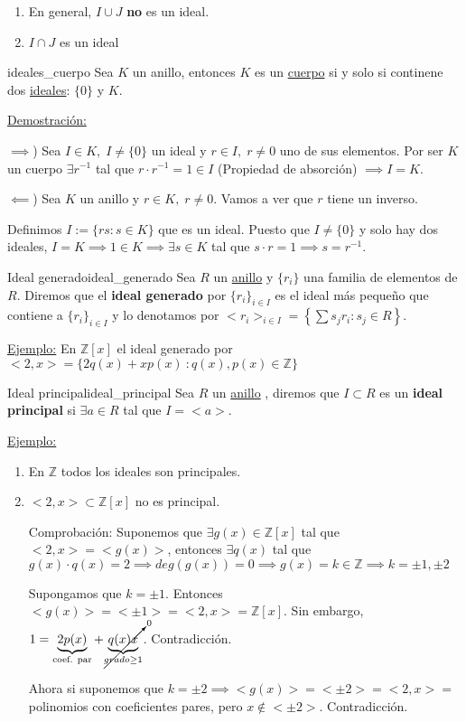 \documentclass[10pt, a4paper]{article}
\newcommand{\Z}{\mathbb{Z}}
\newcommand{\ej}{\underline{Ejemplo:} }
\newcommand{\demo}{\underline{Demostración:} }
\newcommand{\anillo}[1][]{\hyperref[def:anillo]{anillo}#1 }
\newenvironment{enumerater}{\begin{enumerate}[label=\roman*)]}
{\end{enumerate}}
\newenvironment{enumeratea}{\begin{enumerate}[label=\arabic*)]}
{\end{enumerate}}
\begin{document}
\begin{enumerater}
	\item En general, $I \cup J$ \textbf{no} es un ideal.
	\item $I \cap J$ es un ideal
\end{enumerater}

\begin{proposition}{}{ideales_cuerpo}
Sea $K$ un anillo, entonces $K$ es un \hyperref[def:cuerpo]{cuerpo} si y solo si continene dos \hyperref[def:ideal]{ideales}: $\{0\}$ y $K$.
\end{proposition}

\demo 

$\implies$) Sea $I \in K, \; I \neq \{0\}$ un ideal y $r \in I, \; r \neq 0$ uno de sus elementos. Por ser $K$ un cuerpo $\exists r^{-1}$ tal que $r \cdot r^{-1} = 1 \in I$ (Propiedad de absorción) $\implies I = K$.

$\impliedby$) Sea $K$ un anillo y $r \in K, \; r \neq 0$. Vamos a ver que $r$ tiene un inverso.

Definimos $I := \{rs : s \in K\}$ que es un ideal. Puesto que $I \neq \{0\}$ y solo hay dos ideales, $I = K \implies 1 \in K \implies \exists s \in K$ tal que $s \cdot r = 1 \implies s = r^{-1}$.

\begin{definition}{Ideal generado}{ideal_generado}
Sea $R$ un \anillo y $\{r_i\}$ una familia de elementos de $R$. Diremos que el \textbf{ideal generado} por $\{r_i\}_{i \in I}$ es el ideal más pequeño que contiene a $\{r_i\}_{i \in I}$ y lo denotamos por $<r_i>_{i \in I} = \left \{ \displaystyle\sum s_j r_i : s_j \in R \right \}$.
\end{definition}

\ej En $\Z[x]$ el ideal generado por $<2, x> = \{2q(x) + xp(x)\ : q(x), p(x) \in \Z\}$

\begin{definition}{Ideal principal}{ideal_principal}
Sea $R$ un \anillo, diremos que $I \subset R$ es un \textbf{ideal principal} si $\exists a \in R$ tal que $I = <a>$.
\end{definition}

\ej
\begin{enumeratea}
\item En $\Z$ todos los ideales son principales.
\item $<2, x> \subset \Z[x]$ no es principal.

Comprobación: Suponemos que $\exists g(x) \in \Z[x]$ tal que $<2, x> = <g(x)>$, entonces $\exists q(x)$ tal que $g(x) \cdot q(x) = 2 \implies deg(g(x)) = 0 \implies g(x) = k \in \Z \implies k = \pm 1, \pm 2$

Supongamos que $k = \pm 1$. Entonces $<g(x)> = <\pm 1> =<2, x> = \Z[x]$. Sin embargo, $1 = \underbrace{2p(x)}_{\text{coef. par}} + \cancelto{0}{\underbrace{q(x)x}_{grado \geq 1}}$. Contradicción.

Ahora si suponemos que $k = \pm 2 \implies <g(x)> = <\pm 2> = <2, x> =$ polinomios con coeficientes pares, pero $x \notin <\pm 2>$. Contradicción.
\end{enumeratea}
\end{document}
